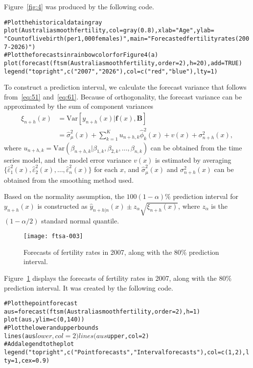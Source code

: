 \documentclass[nojss]{jss}
\newenvironment{smallexample}{\begin{alltt}\small}{\end{alltt}}
\newenvironment{smallverbatim}{\small\verbatim}{\endverbatim}
\begin{document}
Figure~\ref{fig:4} was produced by the following code.
\begin{smallexample}
\begin{smallverbatim}
# Plot the historical data in gray
plot(Australiasmoothfertility, col = gray(0.8), xlab = "Age", ylab = 
"Count of live birth (per 1,000 females)", main = "Forecasted fertility rates (2007-2026)")
# Plot the forecasts in rainbow color for Figure 4(a)
plot(forecast(ftsm(Australiasmoothfertility, order=2), h=20), add=TRUE)
legend("topright", c("2007", "2026"), col = c("red", "blue"), lty = 1)
\end{smallverbatim}
\end{smallexample}

To construct a prediction interval, we calculate the forecast variance that follows from~\eqref{eq:51} and~\eqref{eq:61}. Because of orthogonality, the forecast variance can be approximated by the sum of component variances
\begin{align*}
  \xi_{n+h}(x)&=\text{Var}[y_{n+h}(x)|\bm{f}(x),\mathcal{\bm{B}}]\\
  &=\hat{\sigma}_{\mu}^2(x)+\sum^K_{k=1}u_{n+h,k}\hat{\phi}_k^2(x) + v(x) + \sigma^2_{n+h}(x),
\end{align*}
where $u_{n+h,k}=\text{Var}(\beta_{n+h,k}|\beta_{1,k},\beta_{2,k},\dots,\beta_{n,k})$ can be obtained from the time series model, and the model error variance $v(x)$ is estimated by averaging $\{\hat{\varepsilon}_1^2(x),\hat{\varepsilon}_2^2(x),\dots,\hat{\varepsilon}_n^2(x)\}$ for each $x$, and $\hat{\sigma}_{\mu}^2(x)$ and $\sigma^2_{n+h}(x)$ can be obtained from the smoothing method used.

Based on the normality assumption, the $100(1-\alpha)\%$ prediction interval for $y_{n+h}(x)$ is constructed as $\hat{y}_{n+h|n}(x)\pm z_{\alpha}\sqrt{\xi_{n+h}(x)}$, where $z_{\alpha}$ is the $(1-\alpha/2)$ standard normal quantile.

\begin{figure}[!htbp]
\centering
\texttt{[image: ftsa-003]}
\caption{Forecasts of fertility rates in 2007, along with the 80\% prediction interval.}\label{fig:5}
\end{figure}

Figure~\ref{fig:5} displays the forecasts of fertility rates in 2007, along with the 80\% prediction interval. It was created by the following code.

\begin{smallexample}
  \begin{smallverbatim}
# Plot the point forecast
aus = forecast(ftsm(Australiasmoothfertility, order=2), h=1)
plot(aus, ylim=c(0,140))
# Plot the lower and upper bounds
lines(aus$lower, col=2)
lines(aus$upper, col=2)
# Add a legend to the plot
legend("topright", c("Point forecasts", "Interval forecasts"),col=c(1,2), lty=1, cex=0.9)
  \end{smallverbatim}
\end{smallexample}
\end{document}
